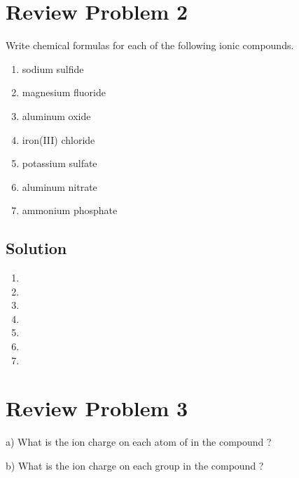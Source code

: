 \documentclass[10pt]{article}
\begin{document}
    \pagebreak
    \section{Review Problem 2}
        Write chemical formulas for each of the following ionic compounds.
        \begin{multicols}{2}
            \begin{enumerate}[label=\alph*)]
                \item sodium sulfide 
                \item magnesium fluoride
                \item aluminum oxide
                \item iron(III) chloride 
                \item potassium sulfate
                \item aluminum nitrate
                \item ammonium phosphate
            \end{enumerate}
        \end{multicols}

        \subsection{Solution}
            \begin{multicols}{4}
                \begin{enumerate}[label=\alph*)]
                    \item   {}
                    \item   {}
                    \item   {}
                    \item   {}
                    \item   {}
                    \item   {}
                    \item   {}
                \end{enumerate}
            \end{multicols}

    \pagebreak
    \section{Review Problem 3}
        a) What is the ion charge on each atom of  in the compound ?

        \noindent 
        b) What is the ion charge on each  group in the compound ?
\end{document}
